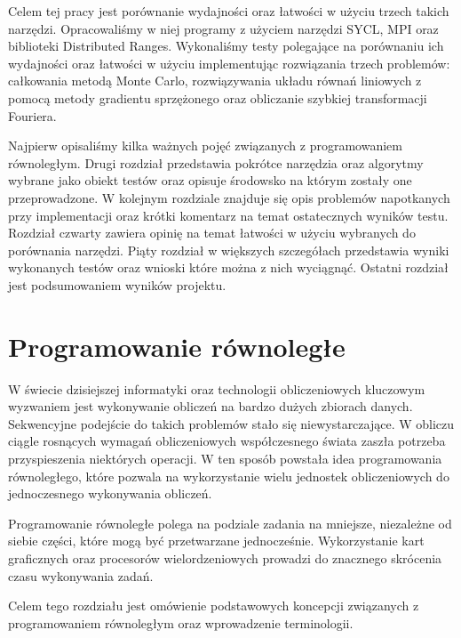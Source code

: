 \documentclass[a4paper,12pt]{book} %
\begin{document}
Celem tej pracy jest porównanie wydajności oraz łatwości w użyciu trzech takich narzędzi. Opracowaliśmy w niej programy z użyciem narzędzi SYCL, MPI oraz biblioteki Distributed Ranges. Wykonaliśmy testy polegające na porównaniu ich wydajności oraz łatwości w użyciu implementując rozwiązania trzech problemów: całkowania metodą Monte Carlo, rozwiązywania układu równań liniowych z pomocą metody gradientu sprzężonego oraz obliczanie szybkiej transformacji Fouriera. 

Najpierw opisaliśmy kilka ważnych pojęć związanych z programowaniem równoległym. Drugi rozdział przedstawia pokrótce narzędzia oraz algorytmy wybrane jako obiekt testów oraz opisuje środowsko na którym zostały one przeprowadzone. W kolejnym rozdziale znajduje się opis problemów napotkanych przy implementacji oraz krótki komentarz na temat ostatecznych wyników testu. Rozdział czwarty zawiera opinię na temat łatwości w użyciu wybranych do porównania narzędzi. Piąty rozdział w większych szczegółach przedstawia wyniki wykonanych testów oraz wnioski które można z nich wyciągnąć. Ostatni rozdział jest podsumowaniem wyników projektu.

\chapter{Programowanie równoległe}
W świecie dzisiejszej informatyki oraz technologii obliczeniowych kluczowym wyzwaniem jest wykonywanie obliczeń na bardzo dużych zbiorach danych. Sekwencyjne podejście do takich problemów stało się niewystarczające. W obliczu ciągle rosnących wymagań obliczeniowych współczesnego świata zaszła potrzeba przyspieszenia niektórych operacji. W ten sposób powstała idea programowania równoległego, które pozwala na wykorzystanie wielu jednostek obliczeniowych do jednoczesnego wykonywania obliczeń.

Programowanie równoległe polega na podziale zadania na mniejsze, niezależne od siebie części, które mogą być przetwarzane jednocześnie. Wykorzystanie kart graficznych oraz procesorów wielordzeniowych prowadzi do znacznego skrócenia czasu wykonywania zadań.

Celem tego rozdziału jest omówienie podstawowych koncepcji związanych z programowaniem równoległym oraz wprowadzenie terminologii.
\end{document}
